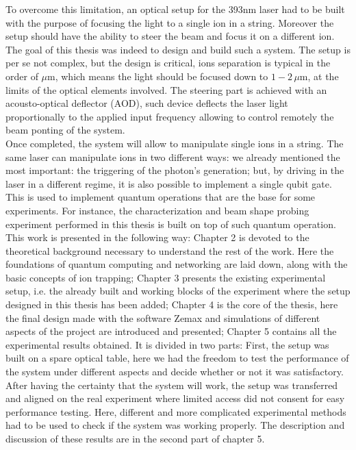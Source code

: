 \documentclass[english, a4paper, 12pt, twoside]{book}
\numberwithin{equation}{section} %
\begin{document}
To overcome this limitation, an optical setup for the 393nm laser had to be built with the purpose of focusing the light to a single ion in a string. Moreover the setup should have the ability to steer the beam and focus it on a different ion. The goal of this thesis was indeed to design and build such a system. The setup is per se not complex, but the design is critical, ions separation is typical in the order of $\mu$m, which means the light should be focused down to $1-2\,\mu$m, at the limits of the optical elements involved. The steering part is achieved with an acousto-optical deflector (AOD), such device deflects the laser light proportionally to the applied input frequency allowing to control remotely the beam ponting of the system.\\
 Once completed, the system will allow to manipulate single ions in a string. The same laser can manipulate ions in two different ways: we already mentioned the most important: the triggering of the photon's generation; but, by driving in the laser in a different regime, it is also possible to implement a single qubit gate. This is used to implement quantum operations that are the base for some experiments. For instance, the characterization and beam shape probing experiment performed in this thesis is built on top of such quantum operation.\\
 \newline
 This work is presented in the following way: Chapter 2 is devoted to the theoretical background necessary to understand the rest of the work. Here the foundations of quantum computing and networking are laid down, along with the basic concepts of ion trapping; Chapter 3 presents the existing experimental setup, i.e. the already built and working blocks of the experiment where the setup designed in this thesis has been added; Chapter 4 is the core of the thesis, here the final design made with the software Zemax and simulations of different aspects of the project are introduced and presented;
Chapter 5 contains all the experimental results obtained. It is divided in two parts: First, the setup was built on a spare optical table, here we had the freedom to test the performance of the system under different aspects and decide whether or not it was satisfactory. After having the certainty that the system will work, the setup was transferred and aligned on the real experiment where limited access did not consent for easy performance testing. Here, different and more complicated experimental methods had to be used to check if the system was working properly. The description and discussion of these results are in the second part of chapter 5.
\end{document}

